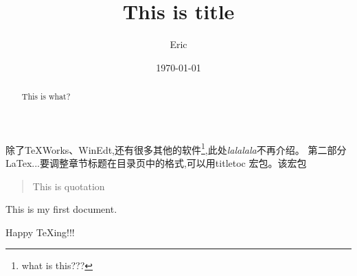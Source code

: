 \documentclass[UTF8]{ctexart}
\title{This is title}
\author{Eric}
\date{\today}
\begin{document}
\begin{abstract}
This is what?
\end{abstract}
\maketitle
\tableofcontents
除了TeXWorks、WinEdt,还有很多其他的软件\footnote{what is this???},此处\emph{lalalala}不再介绍。 第二部分 LaTex...要调整章节标题在目录页中的格式,可以用titletoc 宏包。该宏包
\begin{quote}
This is quotation
\end{quote}



This is my first document.

Happy \TeX ing!!!
\end{document}

